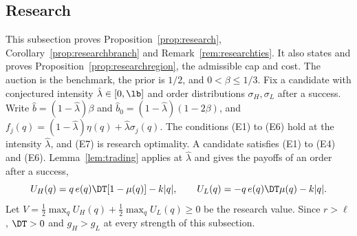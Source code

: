 \subsection{Research}\label{app:research}

This subsection proves Proposition~\ref{prop:research}, Corollary~\ref{prop:researchbranch} and
Remark~\ref{rem:researchties}. It also states and proves Proposition~\ref{prop:researchregion}, the admissible cap
and cost. The auction is the benchmark, the prior is \(1/2\), and \(0<\beta\le1/3\). Fix a
candidate with conjectured intensity \(\hat\lambda\in[0,\lb]\) and order distributions \(\sigma_H,\sigma_L\) after a
success. Write \(\hat b=(1-\hat\lambda)\beta\) and \(\hat b_0=(1-\hat\lambda)(1-2\beta)\), and
\(f_j(q)=(1-\hat\lambda)\eta(q)+\hat\lambda\sigma_j(q)\). The conditions (E1) to (E6) hold at the intensity
\(\hat\lambda\), and (E7) is research optimality. A candidate satisfies (E1) to (E4) and (E6). Lemma~\ref{lem:trading}
applies at \(\hat\lambda\) and gives the payoffs of an order after a success,
\begin{equation}\label{eq:a5-payoffs}
U_H(q)=q\,e(q)\DT[1-\mu(q)]-k|q|,\qquad U_L(q)=-q\,e(q)\DT\mu(q)-k|q| .
\end{equation}
Let \(V=\tfrac12\max_qU_H(q)+\tfrac12\max_qU_L(q)\ge0\) be the research value. Since \(r>\ell\), \(\DT>0\) and
\(g_H>g_L\) at every strength of this subsection.

